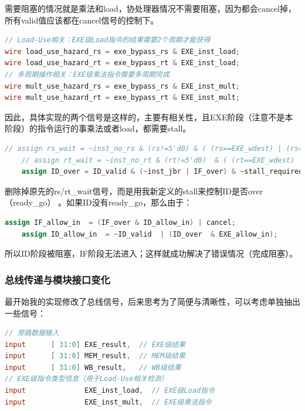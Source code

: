 \documentclass[a4paper]{article}
\begin{document}
需要阻塞的情况就是乘法和load，协处理器情况不需要阻塞，因为都会cancel掉，所有valid值应该都在cancel信号的控制下。


\begin{lstlisting}[language=Verilog,caption={阻塞控制信号-细节}]
// Load-Use相关：EXE级Load指令的结果需要2个周期才能获得
wire load_use_hazard_rs = exe_bypass_rs & EXE_inst_load;
wire load_use_hazard_rt = exe_bypass_rt & EXE_inst_load;
// 多周期操作相关：EXE级乘法指令需要多周期完成
wire mult_use_hazard_rs = exe_bypass_rs & EXE_inst_mult;
wire mult_use_hazard_rt = exe_bypass_rt & EXE_inst_mult;
\end{lstlisting}

因此，具体实现的两个信号是这样的，主要有相关性，且EXE阶段（注意不是本阶段）的指令运行的事乘法或者load，都需要stall。

\begin{lstlisting}[language=Verilog,caption={阻塞控制信号-效果}]
    // assign rs_wait = ~inst_no_rs & (rs!=5'd0) & ( (rs==EXE_wdest) | (rs==MEM_wdest) | (rs==WB_wdest) );
    // assign rt_wait = ~inst_no_rt & (rt!=5'd0)  & ( (rt==EXE_wdest) | (rt==MEM_wdest) | (rt==WB_wdest) );
    assign ID_over = ID_valid & (~inst_jbr | IF_over) & ~stall_required;
\end{lstlisting}

删除掉原先的rs/rt\_wait信号，而是用我新定义的stall来控制ID是否over（ready\_go） 。如果ID没有ready\_go，那么由于：
\begin{lstlisting}[language=Verilog,caption={级联控制}]
    assign IF_allow_in  = (IF_over & ID_allow_in) | cancel;
    assign ID_allow_in  = ~ID_valid  | (ID_over  & EXE_allow_in);
\end{lstlisting}

所以ID阶段被阻塞，IF阶段无法进入；这样就成功解决了错误情况（完成阻塞）。


\subsubsection{总线传递与模块接口变化}

最开始我的实现修改了总线信号，后来思考为了简便与清晰性，可以考虑单独抽出一些信号：
\begin{lstlisting}[language=Verilog,caption={decoder新添加的信号}]
// 旁路数据输入
input      [ 31:0] EXE_result,  // EXE级结果
input      [ 31:0] MEM_result,  // MEM级结果
input      [ 31:0] WB_result,   // WB级结果
// EXE级指令类型信息（用于Load-Use相关检测）
input              EXE_inst_load,  // EXE级Load指令
input              EXE_inst_mult,  // EXE级乘法指令
\end{lstlisting}
\end{document}
